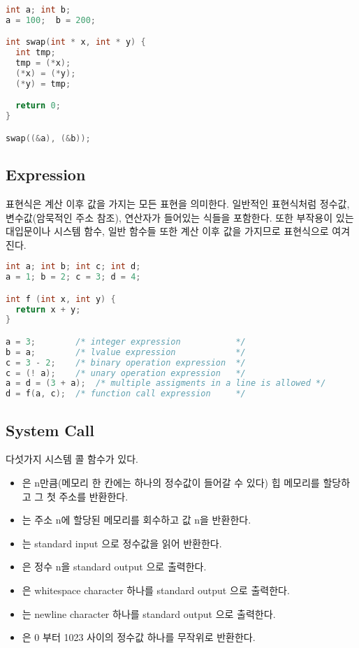 \begin{lstlisting}[language=C, caption=Left value examples 2]
int a; int b;
a = 100;  b = 200;

int swap(int * x, int * y) {
  int tmp;
  tmp = (*x);
  (*x) = (*y);
  (*y) = tmp;

  return 0;
}

swap((&a), (&b));  
\end{lstlisting}




\subsection {Expression}

 표현식은 계산 이후 값을 가지는 모든 표현을 의미한다.
일반적인 표현식처럼 정수값, 변수값(암묵적인 주소 참조), 연산자가 들어있는 식들을 포함한다.
또한 부작용이 있는 대입문이나 시스템 함수, 일반 함수들 또한 계산 이후 값을 가지므로 표현식으로 여겨진다.

\begin{lstlisting}[language=C, caption=Expression examples]
int a; int b; int c; int d;
a = 1; b = 2; c = 3; d = 4;

int f (int x, int y) {
  return x + y;
}

a = 3;        /* integer expression           */
b = a;        /* lvalue expression            */
c = 3 - 2;    /* binary operation expression  */
c = (! a);    /* unary operation expression   */
a = d = (3 + a);  /* multiple assigments in a line is allowed */
d = f(a, c);  /* function call expression     */
\end{lstlisting}




\subsection {System Call}

 다섯가지 시스템 콜 함수가 있다. 
\begin{itemize}
  \item {} 은 n만큼(메모리 한 칸에는 하나의 정수값이 들어갈 수 있다) 힙 메모리를 할당하고 그 첫 주소를 반환한다.
  \item {} 는 주소 n에 할당된 메모리를 회수하고 값 n을 반환한다.
  \item {} 는 standard input 으로 정수값을 읽어 반환한다.
  \item {} 은 정수 n을 standard output 으로 출력한다.
  \item {} 은 whitespace character 하나를 standard output 으로 출력한다.
  \item {} 는 newline character 하나를 standard output 으로 출력한다.
  \item {} 은 0 부터 1023 사이의 정수값 하나를 무작위로 반환한다.
\end{itemize}




